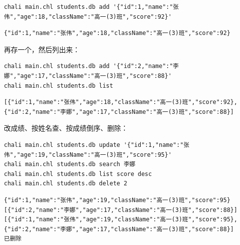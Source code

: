 \par
\medskip
\begin{lstlisting}[style=sh]
chali main.chl students.db add '{"id":1,"name":"张伟","age":18,"className":"高一(3)班","score":92}'
\end{lstlisting}
\par
\medskip

\par
\medskip
\begin{lstlisting}[style=out]
{"id":1,"name":"张伟","age":18,"className":"高一(3)班","score":92}
\end{lstlisting}
\par
\medskip

再存一个，然后列出来：

\par
\medskip
\begin{lstlisting}[style=sh]
chali main.chl students.db add '{"id":2,"name":"李娜","age":17,"className":"高一(3)班","score":88}'
chali main.chl students.db list
\end{lstlisting}
\par
\medskip

\par
\medskip
\begin{lstlisting}[style=out]
[{"id":1,"name":"张伟","age":18,"className":"高一(3)班","score":92},{"id":2,"name":"李娜","age":17,"className":"高一(3)班","score":88}]
\end{lstlisting}
\par
\medskip

改成绩、按姓名查、按成绩倒序、删除：

\par
\medskip
\begin{lstlisting}[style=sh]
chali main.chl students.db update '{"id":1,"name":"张伟","age":19,"className":"高一(3)班","score":95}'
chali main.chl students.db search 李娜
chali main.chl students.db list score desc
chali main.chl students.db delete 2
\end{lstlisting}
\par
\medskip

\par
\medskip
\begin{lstlisting}[style=out]
{"id":1,"name":"张伟","age":19,"className":"高一(3)班","score":95}
[{"id":2,"name":"李娜","age":17,"className":"高一(3)班","score":88}]
[{"id":1,"name":"张伟","age":19,"className":"高一(3)班","score":95},{"id":2,"name":"李娜","age":17,"className":"高一(3)班","score":88}]
已删除
\end{lstlisting}
\par
\medskip

